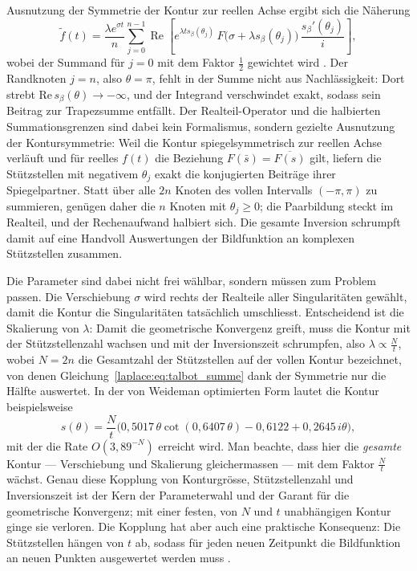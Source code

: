 Ausnutzung der Symmetrie der Kontur zur reellen Achse ergibt sich die
Näherung
\begin{equation}
    \tilde{f}(t)
    =
    \frac{\lambda e^{\sigma t}}{n}
    \sum_{j=0}^{n-1}
    \operatorname{Re}
    \left[
        e^{\lambda t s_{\beta}(\theta_j)}
        \,
        F\bigl(\sigma + \lambda s_{\beta}(\theta_j)\bigr)
        \,
        \frac{s_{\beta}'(\theta_j)}{i}
    \right],
    \label{laplace:eq:talbot_summe}
\end{equation}
wobei der Summand für $j = 0$ mit dem Faktor $\frac{1}{2}$ gewichtet wird
\cite{laplace:murli1990}.
Der Randknoten $j = n$, also $\theta = \pi$, fehlt in der Summe nicht aus
Nachlässigkeit:
Dort strebt $\text{Re}\,s_{\beta}(\theta) \to -\infty$, und der Integrand
verschwindet exakt, sodass sein Beitrag zur Trapezsumme entfällt.
Der Realteil-Operator und die halbierten Summationsgrenzen sind dabei
kein Formalismus, sondern gezielte Ausnutzung der Kontursymmetrie:
Weil die Kontur spiegelsymmetrisch zur reellen Achse verläuft und für
reelles $f(t)$ die Beziehung $F(\bar{s}) = \overline{F(s)}$ gilt, liefern
die Stützstellen mit negativem $\theta_j$ exakt die konjugierten Beiträge
ihrer Spiegelpartner.
Statt über alle $2n$ Knoten des vollen Intervalls $(-\pi, \pi)$ zu
summieren, genügen daher die $n$ Knoten mit $\theta_j \geq 0$; die
Paarbildung steckt im Realteil, und der Rechenaufwand halbiert sich.
Die gesamte Inversion schrumpft damit auf eine Handvoll Auswertungen der
Bildfunktion an komplexen Stützstellen zusammen.

Die Parameter sind dabei nicht frei wählbar, sondern müssen zum Problem
passen.
Die Verschiebung $\sigma$ wird rechts der Realteile aller Singularitäten
gewählt, damit die Kontur die Singularitäten tatsächlich umschliesst.
Entscheidend ist die Skalierung von $\lambda$:
Damit die geometrische Konvergenz greift, muss die Kontur mit der
Stützstellenzahl wachsen und mit der Inversionszeit schrumpfen, also
$\lambda \propto \frac{N}{t}$, wobei $N = 2n$ die Gesamtzahl der
Stützstellen auf der vollen Kontur bezeichnet, von denen
Gleichung~\eqref{laplace:eq:talbot_summe} dank der Symmetrie nur die
Hälfte auswertet.
In der von Weideman \cite{laplace:weideman2006}
optimierten Form lautet die Kontur beispielsweise
\begin{equation}
    s(\theta)
    =
    \frac{N}{t}
    \bigl(
        0{,}5017 \, \theta \cot(0{,}6407\,\theta)
        - 0{,}6122
        + 0{,}2645 \, i\theta
    \bigr),
    \label{laplace:eq:weideman_kontur}
\end{equation}
mit der die Rate $O(3{,}89^{-N})$ erreicht wird.
Man beachte, dass hier die \emph{gesamte} Kontur --- Verschiebung und
Skalierung gleichermassen --- mit dem Faktor $\frac{N}{t}$ wächst.
Genau diese Kopplung von Konturgrösse, Stützstellenzahl und
Inversionszeit ist der Kern der Parameterwahl und der Garant für die
geometrische Konvergenz; mit einer festen, von $N$ und $t$ unabhängigen
Kontur ginge sie verloren.
Die Kopplung hat aber auch eine praktische Konsequenz:
Die Stützstellen hängen von $t$ ab, sodass für jeden neuen Zeitpunkt die
Bildfunktion an neuen Punkten ausgewertet werden muss
\cite{laplace:trefethen2006}.

